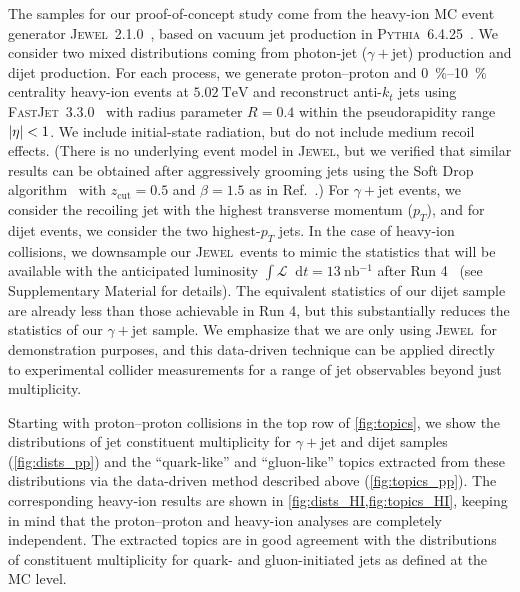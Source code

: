 \documentclass[aps,prl,twocolumn,preprintnumbers,showpacs,floatfix,nofootinbib]{revtex4-1}
\DeclarePairedDelimiter\abs{\lvert}{\rvert}
\newcommand*{\diff}{\mathop{}\!\mathrm{d}}
\newcommand*{\cL}{\mathcal{L}}
\newcommand*{\jewel}{\textsc{Jewel}}
\newcommand*{\pythia}{\textsc{Pythia}}
\newcommand*{\fastjet}{\textsc{FastJet}}
\newcommand{\Refc}[1]{Ref.~\cite{#1}}
\begin{document}
The samples for our proof-of-concept study come from the heavy-ion MC event generator \jewel\ 2.1.0~\cite{Zapp:2013vla,KunnawalkamElayavalli:2016ttl}, based on vacuum jet production in \pythia\ 6.4.25~\cite{Sjostrand:2006za}.
%
We consider two mixed distributions coming from photon-jet ($\gamma+\text{jet}$) production and dijet production.
%
For each process, we generate proton--proton and \SIrange{0}{10}{\percent} centrality heavy-ion events at $\SI{5.02}{\tera\eV}$ and reconstruct anti-$k_t$ jets using \fastjet\ 3.3.0~\cite{Cacciari:2008gp,Cacciari:2011ma} with radius parameter $R = 0.4$ within the pseudorapidity range $\abs{\eta} < 1$.
%
We include initial-state radiation, but do not include medium recoil effects.
%
(There is no underlying event model in \jewel, but we verified that similar results can be obtained after aggressively grooming jets using the Soft Drop algorithm~\cite{Larkoski:2014wba} with $z_\text{cut} = 0.5$ and $\beta = 1.5$ as in \Refc{Sirunyan:2018gct}.)
%
For $\gamma+\text{jet}$ events, we consider the recoiling jet with the highest transverse momentum ($p_T$), and for dijet events, we consider the two highest-$p_T$ jets.
%
In the case of heavy-ion collisions, we downsample our \jewel\ events to mimic the statistics that will be available with the anticipated luminosity $\int \cL \diff t = \SI{13}{\nano\barn^{-1}}$ after Run 4~\cite{Citron:2018lsq} (see Supplementary Material for details).
%
The equivalent statistics of our dijet sample are already less than those achievable in Run 4, but this substantially reduces the statistics of our $\gamma+\text{jet}$ sample.
%
We emphasize that we are only using \jewel\ for demonstration purposes, and this data-driven technique can be applied directly to experimental collider measurements for a range of jet observables beyond just multiplicity.


Starting with proton--proton collisions in the top row of \cref{fig:topics}, we show the distributions of jet constituent multiplicity for $\gamma+\text{jet}$ and dijet samples (\cref{fig:dists_pp}) and the ``quark-like'' and ``gluon-like'' topics extracted from these distributions via the data-driven method described above (\cref{fig:topics_pp}).
%
The corresponding heavy-ion results are shown in \cref{fig:dists_HI,fig:topics_HI}, keeping in mind that the proton--proton and heavy-ion analyses are completely independent.
%
The extracted topics are in good agreement with the distributions of constituent multiplicity for quark- and gluon-initiated jets as defined at the MC level.
\end{document}
